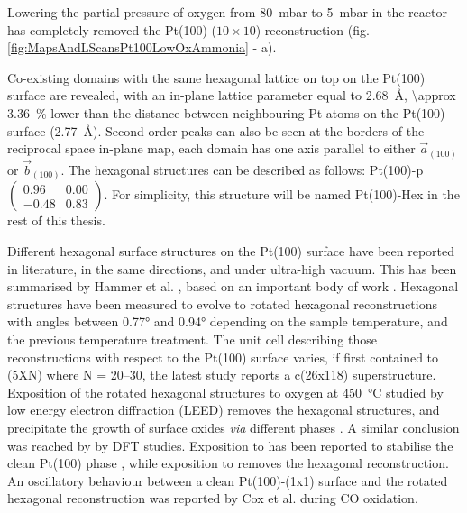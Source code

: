 Lowering the partial pressure of oxygen from \qty{80}{\milli\bar} to \qty{5}{\milli\bar} in the reactor has completely removed the Pt(100)-($10\times10$) reconstruction (fig. \ref{fig:MapsAndLScansPt100LowOxAmmonia} - a).

Co-existing domains with the same hexagonal lattice on top on the Pt(100) surface are revealed, with an in-plane lattice parameter equal to \qty{2.68}{\angstrom}, \qty{\approx 3.36}{\percent} lower than the distance between neighbouring Pt atoms on the Pt(100) surface (\qty{2.77}{\angstrom}).
Second order peaks can also be seen at the borders of the reciprocal space in-plane map, each domain has one axis parallel to either $\vec{a}_{(100)}$ or $\vec{b}_{(100)}$.
The hexagonal structures can be described as follows: Pt(100)-p$\begin{pmatrix} 0.96 & 0.00\\ -0.48 & 0.83 \end{pmatrix}$.
For simplicity, this structure will be named Pt(100)-Hex in the rest of this thesis.

Different hexagonal surface structures on the Pt(100) surface have been reported in literature, in the same directions, and under ultra-high vacuum.
This has been summarised by Hammer et al. \parencite*{Hammer2016}, based on an important body of work \parencite{Heilmann1979, Vanhove1981, Heinz1982, Mase1992, Kuhnke1992, Borg1994, VanBeurden2004, Havu2010}.
Hexagonal structures have been measured to evolve to rotated hexagonal reconstructions with angles between \ang{0.77} and \ang{0.94} depending on the sample temperature, and the previous temperature treatment.
The unit cell describing those reconstructions with respect to the Pt(100) surface varies, if first contained to (5XN) where N = 20–30, the latest study reports a c(26x118) superstructure.
Exposition of the rotated hexagonal structures to oxygen at \qty{450}{\degreeCelsius} studied by low energy electron diffraction (LEED) removes the hexagonal structures, and precipitate the growth of surface oxides \textit{via} different phases \parencite{BradleyShumbera2007, BradleyShumbera2007a}.
A similar conclusion was reached by \cite{Deskins2005} by DFT studies.
Exposition to  has been reported to stabilise the clean Pt(100) phase \parencite{Heinz1982}, while exposition to  removes the hexagonal reconstruction.
An oscillatory behaviour between a clean Pt(100)-(1x1) surface and the rotated hexagonal reconstruction was reported by Cox et al. \parencite*{Cox1983} during CO oxidation.

